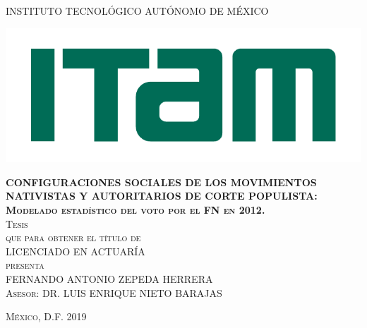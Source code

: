 \begin{titlepage}

\begin{center}

\large{INSTITUTO TECNOLÓGICO AUTÓNOMO DE MÉXICO}\\

\begin{center}
	\includegraphics[scale=0.8]{Figs/logo-ITAM.pdf}
\end{center}

\textsc{\large \textbf{CONFIGURACIONES SOCIALES DE LOS MOVIMIENTOS NATIVISTAS Y AUTORITARIOS DE CORTE POPULISTA: Modelado estadístico del voto por el FN en 2012.}}\\[2em]

\textsc{\large Tesis}\\[1em]

\textsc{que para obtener el título de}\\[1em]

\textsc{LICENCIADO EN ACTUARÍA}\\[1em]

\textsc{presenta}\\[1em]

\textsc{\Large FERNANDO ANTONIO ZEPEDA HERRERA}\\[1em]

\textsc{\large Asesor: DR. LUIS ENRIQUE NIETO BARAJAS}

\end{center}

\vspace*{\fill}
\textsc{México, D.F. \hspace*{\fill} 2019}

\end{titlepage}